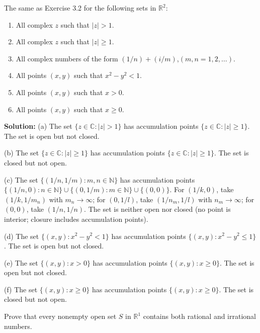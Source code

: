 \begin{problembox}
The same as Exercise 3.2 for the following sets in $\mathbb{R}^2$:
\begin{enumerate}[label=\textbf{(\alph*)}]
\item All complex $z$ such that $|z| > 1$.
\item All complex $z$ such that $|z| \ge 1$.
\item All complex numbers of the form $(1/n) + (i/m)$,\quad $(m, n = 1, 2, \dots)$.
\item All points $(x, y)$ such that $x^2 - y^2 < 1$.
\item All points $(x, y)$ such that $x > 0$.
\item All points $(x, y)$ such that $x \ge 0$.
\end{enumerate}
\end{problembox}

\textbf{Solution:}
(a) The set $\{z \in \mathbb{C} : |z| > 1\}$ has accumulation points $\{z \in \mathbb{C} : |z| \geq 1\}$. The set is open but not closed.

(b) The set $\{z \in \mathbb{C} : |z| \geq 1\}$ has accumulation points $\{z \in \mathbb{C} : |z| \geq 1\}$. The set is closed but not open.

(c) The set $\{(1/n, 1/m) : m,n \in \mathbb{N}\}$ has accumulation points $\{(1/n, 0) : n \in \mathbb{N}\} \cup \{(0, 1/m) : m \in \mathbb{N}\} \cup \{(0, 0)\}$. For $(1/k, 0)$, take $(1/k, 1/m_n)$ with $m_n \to \infty$; for $(0, 1/l)$, take $(1/n_m, 1/l)$ with $n_m \to \infty$; for $(0, 0)$, take $(1/n, 1/n)$. The set is neither open nor closed (no point is interior; closure includes accumulation points).

(d) The set $\{(x,y) : x^2 - y^2 < 1\}$ has accumulation points $\{(x,y) : x^2 - y^2 \leq 1\}$. The set is open but not closed.

(e) The set $\{(x,y) : x > 0\}$ has accumulation points $\{(x,y) : x \geq 0\}$. The set is open but not closed.

(f) The set $\{(x,y) : x \geq 0\}$ has accumulation points $\{(x,y) : x \geq 0\}$. The set is closed but not open.

\begin{problembox}
Prove that every nonempty open set $S$ in $\mathbb{R}^1$ contains both rational and irrational numbers.
\end{problembox}

